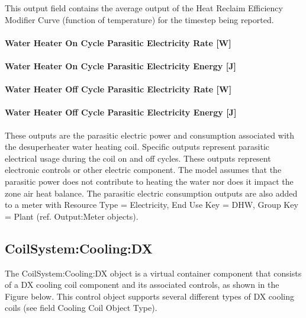 This output field contains the average output of the Heat Reclaim Efficiency Modifier Curve (function of temperature) for the timestep being reported.

\paragraph{Water Heater On Cycle Parasitic Electricity Rate {[}W{]}}\label{water-heater-on-cycle-parasitic-electric-power-w}

\paragraph{Water Heater On Cycle Parasitic Electricity Energy {[}J{]}}\label{water-heater-on-cycle-parasitic-electric-energy-j}

\paragraph{Water Heater Off Cycle Parasitic Electricity Rate {[}W{]}}\label{water-heater-off-cycle-parasitic-electric-power-w}

\paragraph{Water Heater Off Cycle Parasitic Electricity Energy {[}J{]}}\label{water-heater-off-cycle-parasitic-electric-energy-j}

These outputs are the parasitic electric power and consumption associated with the desuperheater water heating coil. Specific outputs represent parasitic electrical usage during the coil on and off cycles. These outputs represent electronic controls or other electric component. The model assumes that the parasitic power does not contribute to heating the water nor does it impact the zone air heat balance. The parasitic electric consumption outputs are also added to a meter with Resource Type = Electricity, End Use Key = DHW, Group Key = Plant (ref. Output:Meter objects).

\subsection{CoilSystem:Cooling:DX}\label{coilsystemcoolingdx}

The CoilSystem:Cooling:DX object is a virtual container component that consists of a DX cooling coil component and its associated controls, as shown in the Figure below. This control object supports several different types of DX cooling coils (see field Cooling Coil Object Type).

